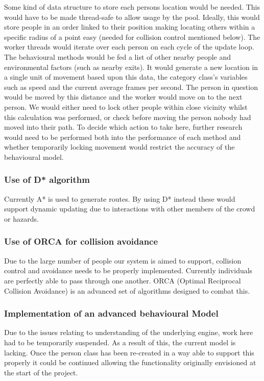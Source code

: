 Some kind of data structure to store each persons location would be needed.
This would have to be made thread-safe to allow usage by the pool.
Ideally, this would store people in an order linked to their position
making locating others within a specific radius of a point easy (needed
for collision control mentioned below). The worker threads would iterate
over each person on each cycle of the update loop. The behavioural
methods would be fed a list of other nearby people and environmental
factors (such as nearby exits). It would generate a new location in
a single unit of movement based upon this data, the category class's
variables such as speed and the current average frames per second.
The person in question would be moved by this distance and the worker
would move on to the next person. We would either need to lock other
people within close vicinity whilst this calculation was performed,
or check before moving the person nobody had moved into their path.
To decide which action to take here, further research would need to
be performed both into the performance of each method and whether
temporarily locking movement would restrict the accuracy of the behavioural
model.


\subsubsection*{Use of D{*} algorithm}

Currently A{*} is used to generate routes. By using D{*} instead these
would support dynamic updating due to interactions with other members
of the crowd or hazards.


\subsubsection*{Use of ORCA for collision avoidance}
\label{Problems:subsubsec:ORCA}

Due to the large number of people our system is aimed to support, collision
control and avoidance needs to be properly implemented. Currently
individuals are perfectly able to pass through one another. ORCA (Optimal
Reciprocal Collision Avoidance) is an advanced set of algorithms designed
to combat this.


\subsubsection*{Implementation of an advanced behavioural Model}

Due to the issues relating to understanding of the underlying engine,
work here had to be temporarily suspended. As a result of this, the
current model is lacking. Once the person class has been
re-created in a way able to support this properly it could be continued
allowing the functionality originally envisioned at the start of the
project.



